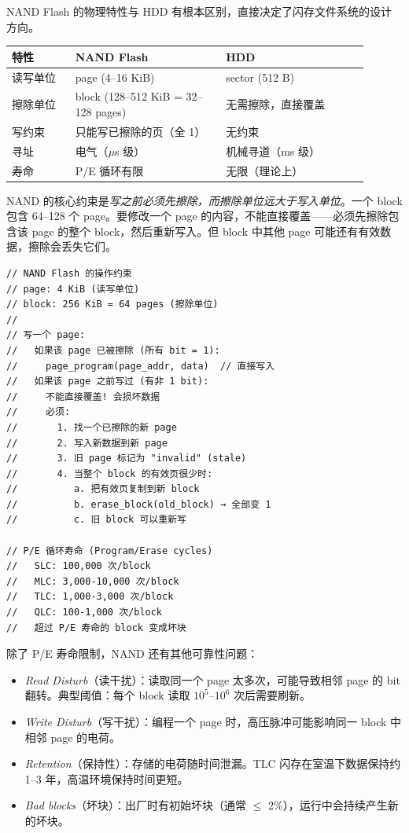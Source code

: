 \begin{filesystemlayout}


NAND Flash 的物理特性与 HDD 有根本区别，直接决定了闪存文件系统的设计方向。

\begin{longtable}{|F{0.16\linewidth}|F{0.38\linewidth}|F{0.36\linewidth}|}
\toprule
{}
特性 & NAND Flash & HDD \\
\midrule
读写单位 & page (4--16 KiB) & sector (512 B) \\\tablerowrule
擦除单位 & block (128--512 KiB = 32--128 pages) & 无需擦除，直接覆盖 \\\tablerowrule
写约束 & 只能写已擦除的页（全 1） & 无约束 \\\tablerowrule
寻址 & 电气（$\mu$s 级） & 机械寻道（ms 级） \\\tablerowrule
寿命 & P/E 循环有限 & 无限（理论上） \\
\bottomrule
\end{longtable}

NAND 的核心约束是\emph{写之前必须先擦除，而擦除单位远大于写入单位}。一个 block 包含 64--128 个 page。要修改一个 page 的内容，不能直接覆盖——必须先擦除包含该 page 的整个 block，然后重新写入。但 block 中其他 page 可能还有有效数据，擦除会丢失它们。

\begin{lstlisting}
// NAND Flash 的操作约束
// page: 4 KiB (读写单位)
// block: 256 KiB = 64 pages (擦除单位)
//
// 写一个 page:
//   如果该 page 已被擦除 (所有 bit = 1):
//     page_program(page_addr, data)  // 直接写入
//   如果该 page 之前写过 (有非 1 bit):
//     不能直接覆盖! 会损坏数据
//     必须:
//       1. 找一个已擦除的新 page
//       2. 写入新数据到新 page
//       3. 旧 page 标记为 "invalid" (stale)
//       4. 当整个 block 的有效页很少时:
//          a. 把有效页复制到新 block
//          b. erase_block(old_block) → 全部变 1
//          c. 旧 block 可以重新写

// P/E 循环寿命 (Program/Erase cycles)
//   SLC: 100,000 次/block
//   MLC: 3,000-10,000 次/block
//   TLC: 1,000-3,000 次/block
//   QLC: 100-1,000 次/block
//   超过 P/E 寿命的 block 变成坏块
\end{lstlisting}

除了 P/E 寿命限制，NAND 还有其他可靠性问题：

\begin{itemize}
\tightlist
\item \emph{Read Disturb}（读干扰）：读取同一个 page 太多次，可能导致相邻 page 的 bit 翻转。典型阈值：每个 block 读取 $10^5$--$10^6$ 次后需要刷新。
\item \emph{Write Disturb}（写干扰）：编程一个 page 时，高压脉冲可能影响同一 block 中相邻 page 的电荷。
\item \emph{Retention}（保持性）：存储的电荷随时间泄漏。TLC 闪存在室温下数据保持约 1--3 年，高温环境保持时间更短。
\item \emph{Bad blocks}（坏块）：出厂时有初始坏块（通常 $\le$ 2\%），运行中会持续产生新的坏块。
\end{itemize}


\end{filesystemlayout}
